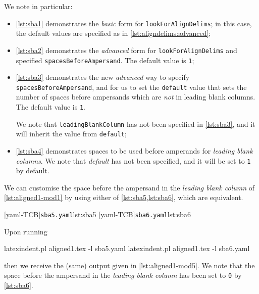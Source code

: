 	\begin{cmhtcbraster}
	\end{cmhtcbraster}

	We note in particular:
	\begin{itemize}
		\item \cref{lst:sba1} demonstrates the \emph{basic} form for
		      \texttt{lookForAlignDelims}; in this case,
		      the default values are specified as in \vref{lst:aligndelims:advanced};
		\item \cref{lst:sba2} demonstrates the \emph{advanced} form for
		      \texttt{lookForAlignDelims}
		      and specified \texttt{spacesBeforeAmpersand}. The default value is \texttt{1};
		\item \cref{lst:sba3} demonstrates the new \emph{advanced} way to specify
		      \texttt{spacesBeforeAmpersand}, and
		      for us to set the \texttt{default} value that sets the number of spaces before
		      ampersands which are \emph{not} in leading blank columns.	      The default
		      value is \texttt{1}.

		      We note that \texttt{leadingBlankColumn} has not been specified in \cref{lst:sba3},
		      and it will inherit the value from \texttt{default};
		\item \cref{lst:sba4} demonstrates spaces to be used before amperands for
		      \emph{leading blank columns}.
		      We note that \emph{default} has not been specified, and it will be set to
		      \texttt{1} by default.
	\end{itemize}
	We can customise the space before the ampersand in the \emph{leading blank column} of
	\cref{lst:aligned1-mod1} by using either of \cref{lst:sba5,lst:sba6}, which are equivalent.

	\begin{cmhtcbraster}
		[yaml-TCB]{\texttt{sba5.yaml}}{lst:sba5}
		[yaml-TCB]{\texttt{sba6.yaml}}{lst:sba6}
	\end{cmhtcbraster}

	Upon running
	\begin{commandshell}
latexindent.pl aligned1.tex -l sba5.yaml
latexindent.pl aligned1.tex -l sba6.yaml
\end{commandshell}
	then we receive the (same) output given in \cref{lst:aligned1-mod5}. We note that the
	space before the ampersand in the \emph{leading blank column} has been set to
	\texttt{0} by \cref{lst:sba6}.

